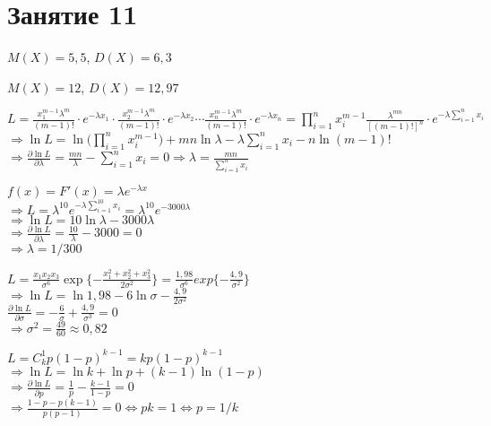 \section*{Занятие 11}

\begin{exercise}[1]
	$M(X) = 5,5$, $D(X) = 6,3$
\end{exercise}

\begin{exercise}[2]
	$M(X) = 12$, $D(X) = 12,97$
\end{exercise}

\begin{exercise}[3]
	$L = \frac{x_1^{m-1}\lambda^m}{(m-1)!}\cdot e^{-\lambda x_1} \cdot \frac{x_2^{m-1}\lambda^m}{(m-1)!}\cdot e^{-\lambda x_2} \cdots \frac{x_n^{m-1}\lambda^m}{(m-1)!}\cdot e^{-\lambda x_n} = \prod_{i=1}^{n}x_i^{m-1}\frac{\lambda^{mn}}{[(m-1)!]^n} \cdot e^{-\lambda\sum_{i=1}^{n}x_i}$ \\ $\Rightarrow \ln L = \ln \Big(\prod_{i=1}^{n}x_i^{m-1}\Big) + mn\ln \lambda - \lambda\sum_{i=1}^{n}x_i - n\ln (m-1)!$ \\ $\Rightarrow \frac{\partial \ln L}{\partial \lambda} = \frac{mn}{\lambda} - \sum_{i=1}^{n}x_i = 0 \Rightarrow \lambda = \frac{mn}{\sum_{i=1}^{n}x_i}$
\end{exercise}

\begin{exercise}[4]
	$f(x) = F'(x) = \lambda e^{-\lambda x}$ \\ $\Rightarrow L = \lambda^{10} e^{-\lambda\sum_{i=1}^{10}x_i} = \lambda^{10} e^{-3000\lambda}$ \\ $\Rightarrow \ln L = 10 \ln \lambda - 3000 \lambda$ \\ $\Rightarrow \frac{\partial \ln L}{\partial \lambda} = \frac{10}{\lambda} - 3000 = 0$ \\ $\Rightarrow \lambda = 1/300$
\end{exercise}

\begin{exercise}[5]
	$L = \frac{x_1 x_2 x_3}{\sigma^6}\exp\{-\frac{x_1^2+x_2^2+x_3^2}{2\sigma^2}\} = \frac{1,98}{\sigma^6}exp\{-\frac{4,9}{\sigma^2}\}$ \\ $\Rightarrow \ln L = \ln 1,98 - 6\ln \sigma - \frac{4,9}{2\sigma^2}$ \\ $\frac{\partial\ln L}{\partial \sigma} = -\frac{6}{\sigma}+\frac{4,9}{\sigma^3}=0$ \\ $\Rightarrow \sigma^2 = \frac{49}{60} \approx 0,82$
\end{exercise}

\begin{exercise}[6]
	$L = C^1_k p (1-p)^{k-1} = kp(1-p)^{k-1}$ \\ $\Rightarrow \ln L = \ln k + \ln p + (k-1)\ln(1-p)$ \\ $\Rightarrow \frac{\partial \ln L}{\partial p} = \frac{1}{p} - \frac{k-1}{1-p} = 0$ \\ $\Rightarrow \frac{1-p-p(k-1)}{p(p-1)} = 0 \Leftrightarrow pk = 1 \Leftrightarrow p = 1/k$
\end{exercise}